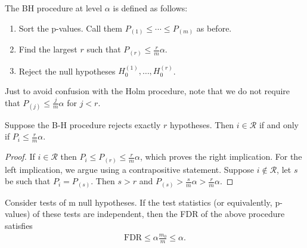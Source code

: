 \begin{de}
The BH procedure at level $\alpha$ is defined as follows:
\begin{enumerate}
    \item Sort the p-values. Call them $P_{(1)} \leq \cdots \leq P_{(m)}$ as before.
    \item Find the largest $r$ such that $P_{(r)} \leq \frac{r}{m} \alpha$.
    \item Reject the null hypotheses $H_0^{(1)}, \ldots, H_0^{(r)}$.
\end{enumerate}
\end{de}

\begin{remark}
    Just to avoid confusion with the Holm procedure, note that we do not require that $P_{(j)} \leq \frac{j}{m} \alpha$ for $j<r$.
\end{remark}
\begin{lem}
    Suppose the B-H procedure rejects exactly $r$ hypotheses. Then $i \in \mathcal{R}$ if and only if $P_i \leq \frac{r}{m} \alpha$.
\end{lem}

\begin{proof}
    If $i \in \mathcal{R}$ then $P_i \leq P_{(r)} \leq \frac{r}{m} \alpha$, which proves the right implication. For the left implication, we argue using a contrapositive statement. Suppose $i \notin \mathcal{R}$, let $s$ be such that $P_i=P_{(s)}$. Then $s>r$ and $P_{(s)}>\frac{s}{m} \alpha>\frac{r}{m} \alpha$.
\end{proof}

\begin{thm}
     Consider tests of m null hypotheses. If the test statistics (or equivalently, p-values) of these tests are independent, then the FDR of the above procedure satisfies
\begin{align*}
\mathrm{FDR} \leq \alpha \frac{m_0}{m} \leq \alpha .
\end{align*}
\end{thm}

